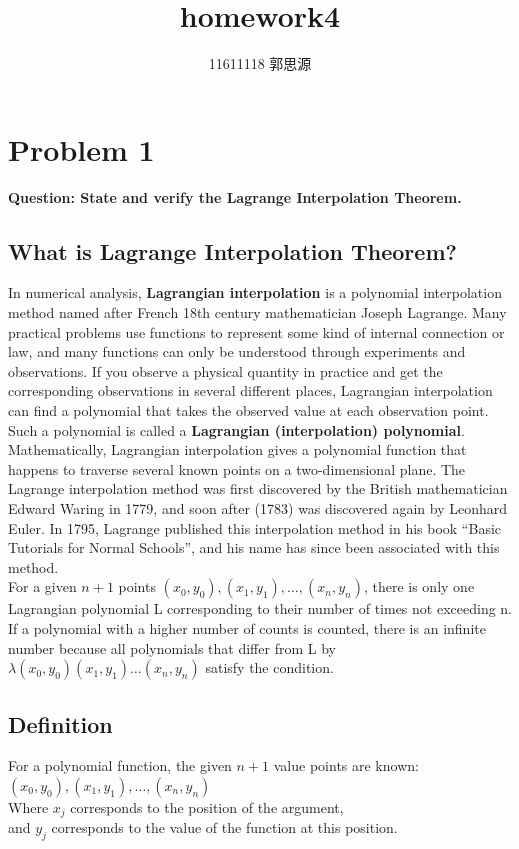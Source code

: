 \documentclass[12pt,a4paper]{article}
\begin{document}
 
\title{homework4}
	\author{11611118 郭思源}  

\section{Problem 1}
\textbf{Question: State and verify the Lagrange Interpolation Theorem.}

\begin{spacing}{1.5}%
\subsection{What is Lagrange Interpolation Theorem?}
\noindent In numerical analysis, \textbf{Lagrangian interpolation} is a polynomial interpolation method named after French 18th century mathematician Joseph Lagrange. Many practical problems use functions to represent some kind of internal connection or law, and many functions can only be understood through experiments and observations. If you observe a physical quantity in practice and get the corresponding observations in several different places, Lagrangian interpolation can find a polynomial that takes the observed value at each observation point. Such a polynomial is called a \textbf{Lagrangian (interpolation) polynomial}. Mathematically,  Lagrangian interpolation gives a polynomial function that happens to traverse several known points on a two-dimensional plane. The Lagrange interpolation method was first discovered by the British mathematician Edward Waring in 1779, and soon after (1783) was discovered again by Leonhard Euler. In 1795, Lagrange published this interpolation method in his book ``Basic Tutorials for Normal Schools'', and his name has since been associated with this method.\\

\noindent 
For a given ${n+1}$ points ${(x_0,y_0), (x_1,y_1),\ldots,(x_n,y_n)}$, there is only one Lagrangian polynomial L corresponding to their number of times not exceeding n. If a polynomial with a higher number of counts is counted, there is an infinite number because all polynomials that differ from L by 
${\lambda(x_0,y_0)(x_1,y_1)\ldots(x_n,y_n)}$ satisfy the condition.

\newpage
\subsection{Definition}
\noindent For a polynomial function, the given ${n+1}$ value points are known:\\
${(x_0,y_0), (x_1,y_1),\ldots,(x_n,y_n)}$\\
Where ${x_{j}}$ corresponds to the position of the argument, \\
and ${y_{j}}$ corresponds to the value of the function at this position.\\


\end{spacing}
\end{document}
